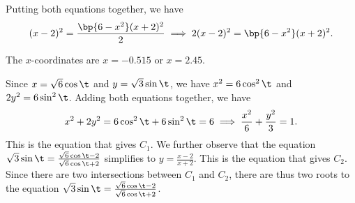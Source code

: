 \begin{solution}
\begin{ppart}
        Putting both equations together, we have \[(x-2)^2 = \frac{\bp{6-x^2}(x+2)^2}2 \implies 2(x-2)^2 = \bp{6-x^2}(x+2)^2.\]
    \end{ppart}
    \begin{ppart}
        The $x$-coordinates are $x = -0.515$ or $x = 2.45$.
    \end{ppart}
    \begin{ppart}
        Since $x = \sqrt 6 \cos\t$ and $y = \sqrt3 \sin\t$, we have $x^2 = 6\cos^2\t$ and $2y^2 = 6 \sin^2\t$. Adding both equations together, we have \[x^2 + 2y^2 = 6\cos^2\t + 6\sin^2\t =6 \implies \frac{x^2}6 + \frac{y^2}3 = 1.\] This is the equation that gives $C_1$. We further observe that the equation $\sqrt3 \sin\t = \frac{\sqrt6 \cos\t -2}{\sqrt6 \cos\t+2}$ simplifies to $y = \frac{x-2}{x+2}$. This is the equation that gives $C_2$. Since there are two intersections between $C_1$ and $C_2$, there are thus two roots to the equation $\sqrt3 \sin\t = \frac{\sqrt6 \cos\t -2}{\sqrt6 \cos\t+2}$.
    \end{ppart}
\end{solution}